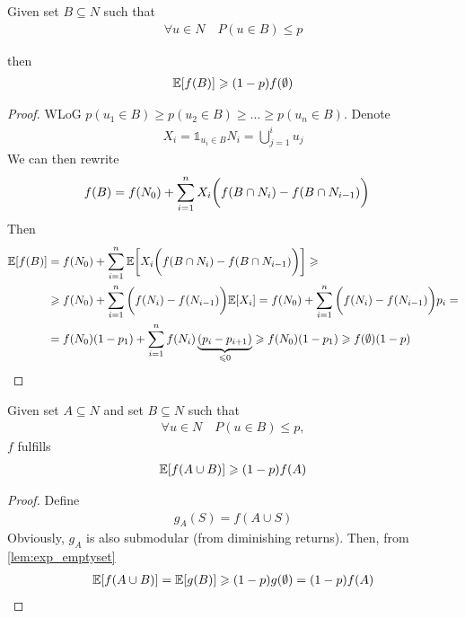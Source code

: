\begin{lemma} \label{lem:exp_emptyset}
	Given  set $B\subseteq N$ such that
	\begin{align}
	\forall u \in  N \quad P(u\in B) \leqslant p
	\end{align}
	
	then
	\begin{align}
	\mathbb{E} \qty[f(B)] \geqslant (1-p)f(\emptyset)
	\end{align}
	\begin{proof}
		WLoG $p(u_1\in B) \geqslant p(u_2\in B) \geqslant \dots \geqslant p(u_n\in B)$. Denote 
		\begin{align}
		X_i = \mathds{1}_{u_i \in B}
		N_i = \bigcup_{j=1}^i u_j
		\end{align}
		We can then rewrite
		\begin{align}
		f(B) &= f(N_0) + \sum_{i=1}^n X_i\qty\bigg(f(B\cap N_{i}) - f(B\cap N_{i-1}))
		\end{align}
		Then
		\begin{align}
		\mathbb{E} \qty[f(B)] &= f(N_0) +\sum_{i=1}^n \mathbb{E} \qty[ X_i\qty\bigg(f(B\cap N_{i}) - f(B\cap N_{i-1}))]\geqslant\\&\geqslant f(N_0) +\sum_{i=1}^n \qty\bigg(f(N_{i}) - f(N_{i-1}))\mathbb{E} \qty[ X_i] =f(N_0) +\sum_{i=1}^n \qty\bigg(f(N_{i}) - f(N_{i-1}))p_i =\\&= f(N_0) (1-p_1) + \sum_{i=1}^n f(N_i)\underbrace{ (p_i-p_{i+1})}_{\leqslant 0} \geqslant f(N_0) (1-p_1)  \geqslant f(\emptyset) (1-p)
		\end{align}
		
	\end{proof}
\end{lemma}
\begin{lemma} \label{lem:exp}
	Given set $A\subseteq N$ and set $B\subseteq N$ such that
	\begin{align}
	\forall u \in  N \quad P(u\in B) \leqslant p,
	\end{align}
	$f$ fulfills
	\begin{align}
	\mathbb{E} \qty[f(A\cup B)] \geqslant (1-p)f(A)
	\end{align}
	
	\begin{proof}
		Define
		\begin{align}
		g_A(S) = f(A\cup S) 
		\end{align}
		Obviously, $g_A$ is also submodular (from diminishing returns). Then, from \vref{lem:exp_emptyset}
		\begin{align}
		\mathbb{E} \qty[f(A\cup B)] = \mathbb{E} \qty[g(B)]\geqslant (1-p)g(\emptyset) = (1-p)f(A)
		\end{align}
	\end{proof}
\end{lemma}

